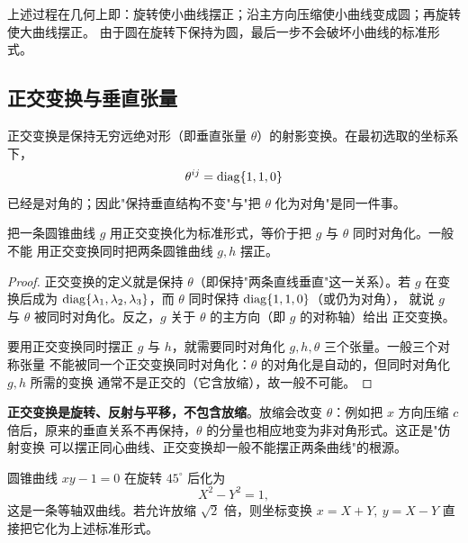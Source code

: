 \begin{remark}
上述过程在几何上即：旋转使小曲线摆正；沿主方向压缩使小曲线变成圆；再旋转使大曲线摆正。
由于圆在旋转下保持为圆，最后一步不会破坏小曲线的标准形式。
\end{remark}

\subsection{正交变换与垂直张量}

正交变换是保持无穷远绝对形（即垂直张量 $\theta$）的射影变换。在最初选取的坐标系下，
\[
\theta^{ij}=\operatorname{diag}\{1,1,0\}
\]
已经是对角的；因此"保持垂直结构不变"与"把 $\theta$ 化为对角"是同一件事。

\begin{proposition}
\label{prop:orth}
把一条圆锥曲线 $g$ 用正交变换化为标准形式，等价于把 $g$ 与 $\theta$ 同时对角化。一般不能
用正交变换同时把两条圆锥曲线 $g,h$ 摆正。
\end{proposition}

\begin{proof}
正交变换的定义就是保持 $\theta$（即保持"两条直线垂直"这一关系）。若 $g$ 在变换后成为
$\operatorname{diag}\{\lambda_1,\lambda_2,\lambda_3\}$，而 $\theta$ 同时保持 $\operatorname{diag}\{1,1,0\}$（或仍为对角），
就说 $g$ 与 $\theta$ 被同时对角化。反之，$g$ 关于 $\theta$ 的主方向（即 $g$ 的对称轴）给出
正交变换。

要用正交变换同时摆正 $g$ 与 $h$，就需要同时对角化 $g,h,\theta$ 三个张量。一般三个对称张量
不能被同一个正交变换同时对角化：$\theta$ 的对角化是自动的，但同时对角化 $g,h$ 所需的变换
通常不是正交的（它含放缩），故一般不可能。
\end{proof}

\begin{remark}
\textbf{正交变换是旋转、反射与平移，不包含放缩}。放缩会改变 $\theta$：例如把 $x$ 方向压缩
$c$ 倍后，原来的垂直关系不再保持，$\theta$ 的分量也相应地变为非对角形式。这正是"仿射变换
可以摆正同心曲线、正交变换却一般不能摆正两条曲线"的根源。
\end{remark}

\begin{example}[反比例函数]
圆锥曲线 $xy-1=0$ 在旋转 $45^\circ$ 后化为
\[
X^2-Y^2=1,
\]
这是一条等轴双曲线。若允许放缩 $\sqrt2$ 倍，则坐标变换
$x=X+Y,\ y=X-Y$ 直接把它化为上述标准形式。
\end{example}

